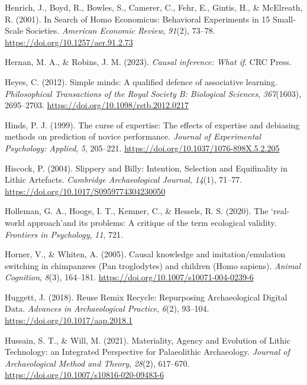 \documentclass[
  11pt,
  letterpaper,
  DIV=11,
  numbers=noendperiod]{scrartcl}
\newlength{\cslhangindent}
\newenvironment{CSLReferences}[2] %
 {\begin{list}{}{%
  \setlength{\itemindent}{0pt}
  \setlength{\leftmargin}{0pt}
  \setlength{\parsep}{0pt}
  \ifodd #1
   \setlength{\leftmargin}{\cslhangindent}
   \setlength{\itemindent}{-1\cslhangindent}
  \fi
  \setlength{\itemsep}{#2\baselineskip}}}
 {\end{list}}
\begin{document}
\begin{CSLReferences}{1}{0}
Henrich, J., Boyd, R., Bowles, S., Camerer, C., Fehr, E., Gintis, H., \&
McElreath, R. (2001). In {Search} of {Homo} {Economicus}: {Behavioral}
{Experiments} in 15 {Small}-{Scale} {Societies}. \emph{American Economic
Review}, \emph{91}(2), 73--78. \url{https://doi.org/10.1257/aer.91.2.73}

Hernan, M. A., \& Robins, J. M. (2023). \emph{Causal inference: What
if}. CRC Press.

Heyes, C. (2012). Simple minds: A qualified defence of associative
learning. \emph{Philosophical Transactions of the Royal Society B:
Biological Sciences}, \emph{367}(1603), 2695--2703.
\url{https://doi.org/10.1098/rstb.2012.0217}

Hinds, P. J. (1999). The curse of expertise: The effects of expertise
and debiasing methods on prediction of novice performance. \emph{Journal
of Experimental Psychology: Applied}, \emph{5}, 205--221.
\url{https://doi.org/10.1037/1076-898X.5.2.205}

Hiscock, P. (2004). Slippery and Billy: Intention, Selection and
Equifinality in Lithic Artefacts. \emph{Cambridge Archaeological
Journal}, \emph{14}(1), 71--77.
\url{https://doi.org/10.1017/S0959774304230050}

Holleman, G. A., Hooge, I. T., Kemner, C., \& Hessels, R. S. (2020). The
{`}real-world approach{'}and its problems: A critique of the term
ecological validity. \emph{Frontiers in Psychology}, \emph{11}, 721.

Horner, V., \& Whiten, A. (2005). Causal knowledge and
imitation/emulation switching in chimpanzees (Pan troglodytes) and
children (Homo sapiens). \emph{Animal Cognition}, \emph{8}(3), 164--181.
\url{https://doi.org/10.1007/s10071-004-0239-6}

Huggett, J. (2018). Reuse Remix Recycle: Repurposing Archaeological
Digital Data. \emph{Advances in Archaeological Practice}, \emph{6}(2),
93--104. \url{https://doi.org/10.1017/aap.2018.1}

Hussain, S. T., \& Will, M. (2021). Materiality, Agency and Evolution of
Lithic Technology: an Integrated Perspective for Palaeolithic
Archaeology. \emph{Journal of Archaeological Method and Theory},
\emph{28}(2), 617--670. \url{https://doi.org/10.1007/s10816-020-09483-6}


\end{CSLReferences}
\end{document}

